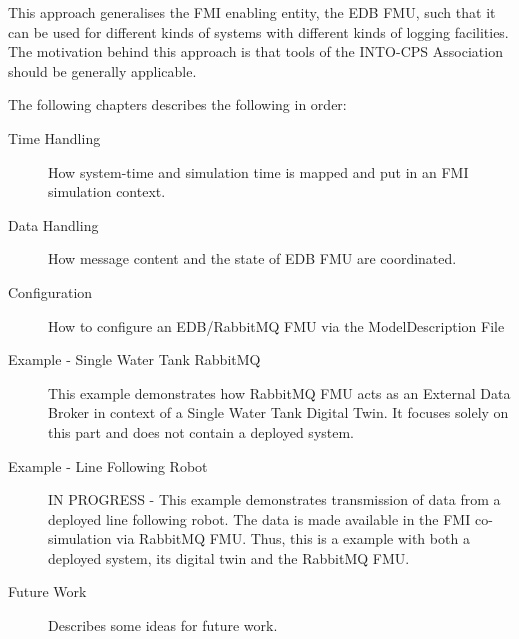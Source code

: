 This approach generalises the FMI enabling entity, the EDB FMU, such that
it can be used for different kinds of systems with different kinds of logging
facilities. The motivation behind this approach is that tools of the INTO-CPS Association
should be generally applicable.

The following chapters describes the following in order:
\begin{description}
  \item[Time Handling] How system-time and simulation time is mapped and put in
    an FMI simulation context.
  \item[Data Handling] How message content and the state of EDB FMU are
    coordinated.
  \item[Configuration] How to configure an EDB/RabbitMQ FMU via the ModelDescription File
  \item[Example - Single Water Tank RabbitMQ] This example demonstrates how RabbitMQ FMU
    acts as an External Data Broker in context of a Single Water Tank Digital Twin. It focuses solely on this part and does not
    contain a deployed system.

    \item[Example - Line Following Robot] IN PROGRESS - This example demonstrates transmission
    of data from a deployed line following robot. The data is made available in
    the FMI co-simulation via RabbitMQ FMU. Thus, this is a example with
    both a deployed system, its digital twin and the RabbitMQ FMU.
  \item[Future Work] Describes some ideas for future work.
\end{description}


